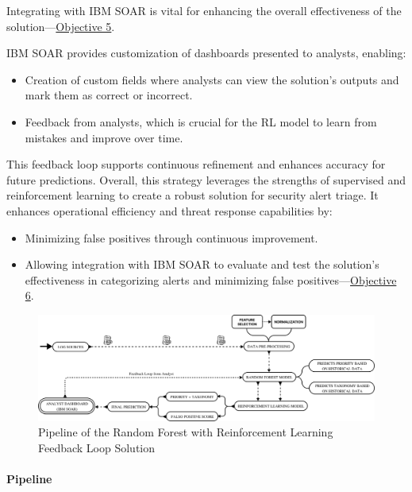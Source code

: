 Integrating with IBM SOAR is vital for enhancing the overall effectiveness of the solution—\hyperref[objective5]{Objective 5}. 

IBM SOAR provides customization of dashboards presented to analysts, enabling:

\begin{itemize}
    \item Creation of custom fields where analysts can view the solution's outputs and mark them as correct or incorrect.
    \item Feedback from analysts, which is crucial for the RL model to learn from mistakes and improve over time.
\end{itemize}

This feedback loop supports continuous refinement and enhances accuracy for future predictions. 
Overall, this strategy leverages the strengths of supervised and reinforcement learning to create a robust solution for security alert triage. 
It enhances operational efficiency and threat response capabilities by:

\begin{itemize}
    \item Minimizing false positives through continuous improvement.
    \item Allowing integration with IBM SOAR to evaluate and test the solution's effectiveness in categorizing alerts and minimizing false positives—\hyperref[objective6]{Objective 6}.
\end{itemize}

\begin{figure}[h]
    \centering
    \includegraphics[width=\textwidth]{ch3/assets/solution1_pipeline.png}
    \caption{Pipeline of the Random Forest with Reinforcement Learning Feedback Loop Solution}
    \label{fig:solution1_pipeline}
\end{figure}

\paragraph{Pipeline}


